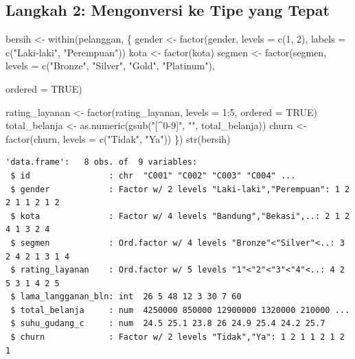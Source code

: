 \documentclass[
  indonesian,
  letterpaper,
]{book}
\newenvironment{Shaded}{\begin{snugshade}}{\end{snugshade}}
\newcommand{\AttributeTok}[1]{\textcolor[rgb]{0.40,0.45,0.13}{#1}}
\newcommand{\ConstantTok}[1]{\textcolor[rgb]{0.56,0.35,0.01}{#1}}
\newcommand{\DecValTok}[1]{\textcolor[rgb]{0.68,0.00,0.00}{#1}}
\newcommand{\FunctionTok}[1]{\textcolor[rgb]{0.28,0.35,0.67}{#1}}
\newcommand{\NormalTok}[1]{\textcolor[rgb]{0.00,0.23,0.31}{#1}}
\newcommand{\OtherTok}[1]{\textcolor[rgb]{0.00,0.23,0.31}{#1}}
\newcommand{\SpecialCharTok}[1]{\textcolor[rgb]{0.37,0.37,0.37}{#1}}
\newcommand{\StringTok}[1]{\textcolor[rgb]{0.13,0.47,0.30}{#1}}
\begin{document}
\subsection{Langkah 2: Mengonversi ke Tipe yang
Tepat}\label{langkah-2-mengonversi-ke-tipe-yang-tepat}

\begin{Shaded}
\begin{Highlighting}[]
\NormalTok{bersih }\OtherTok{\textless{}{-}} \FunctionTok{within}\NormalTok{(pelanggan, \{}
\NormalTok{gender }\OtherTok{\textless{}{-}} \FunctionTok{factor}\NormalTok{(gender, }\AttributeTok{levels =} \FunctionTok{c}\NormalTok{(}\DecValTok{1}\NormalTok{, }\DecValTok{2}\NormalTok{), }\AttributeTok{labels =} \FunctionTok{c}\NormalTok{(}\StringTok{"Laki{-}laki"}\NormalTok{, }\StringTok{"Perempuan"}\NormalTok{))}
\NormalTok{kota }\OtherTok{\textless{}{-}} \FunctionTok{factor}\NormalTok{(kota)}
\NormalTok{segmen }\OtherTok{\textless{}{-}} \FunctionTok{factor}\NormalTok{(segmen, }\AttributeTok{levels =} \FunctionTok{c}\NormalTok{(}\StringTok{"Bronze"}\NormalTok{, }\StringTok{"Silver"}\NormalTok{, }\StringTok{"Gold"}\NormalTok{, }\StringTok{"Platinum"}\NormalTok{),}

\AttributeTok{ordered =} \ConstantTok{TRUE}\NormalTok{)}

\NormalTok{rating\_layanan }\OtherTok{\textless{}{-}} \FunctionTok{factor}\NormalTok{(rating\_layanan, }\AttributeTok{levels =} \DecValTok{1}\SpecialCharTok{:}\DecValTok{5}\NormalTok{, }\AttributeTok{ordered =} \ConstantTok{TRUE}\NormalTok{)}
\NormalTok{total\_belanja }\OtherTok{\textless{}{-}} \FunctionTok{as.numeric}\NormalTok{(}\FunctionTok{gsub}\NormalTok{(}\StringTok{"[\^{}0{-}9]"}\NormalTok{, }\StringTok{""}\NormalTok{, total\_belanja))}
\NormalTok{churn }\OtherTok{\textless{}{-}} \FunctionTok{factor}\NormalTok{(churn, }\AttributeTok{levels =} \FunctionTok{c}\NormalTok{(}\StringTok{"Tidak"}\NormalTok{, }\StringTok{"Ya"}\NormalTok{))}
\NormalTok{\})}
\FunctionTok{str}\NormalTok{(bersih)}
\end{Highlighting}
\end{Shaded}

\begin{verbatim}
'data.frame':   8 obs. of  9 variables:
 $ id                : chr  "C001" "C002" "C003" "C004" ...
 $ gender            : Factor w/ 2 levels "Laki-laki","Perempuan": 1 2 2 1 1 2 1 2
 $ kota              : Factor w/ 4 levels "Bandung","Bekasi",..: 2 1 2 4 1 3 2 4
 $ segmen            : Ord.factor w/ 4 levels "Bronze"<"Silver"<..: 3 2 4 2 1 3 1 4
 $ rating_layanan    : Ord.factor w/ 5 levels "1"<"2"<"3"<"4"<..: 4 2 5 3 1 4 2 5
 $ lama_langganan_bln: int  26 5 48 12 3 30 7 60
 $ total_belanja     : num  4250000 850000 12900000 1320000 210000 ...
 $ suhu_gudang_c     : num  24.5 25.1 23.8 26 24.9 25.4 24.2 25.7
 $ churn             : Factor w/ 2 levels "Tidak","Ya": 1 2 1 1 2 1 2 1
\end{verbatim}
\end{document}
